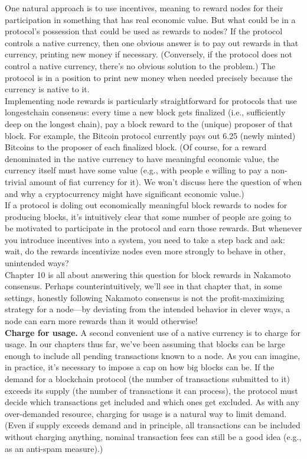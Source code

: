 One natural approach is to use incentives, meaning to reward nodes for their participation
in something that has real economic value. But what could be in a protocol’s possession
that could be used as rewards to nodes? If the protocol controls a native currency, then
one obvious answer is to pay out rewards in that currency, printing new money if necessary.
(Conversely, if the protocol does not control a native currency, there’s no obvious solution
to the problem.) The protocol is in a position to print new money when needed precisely
because the currency is native to it.\\

Implementing node rewards is particularly straightforward for protocols that use longestchain consensus: every time a new block gets finalized (i.e., sufficiently deep on the longest
chain), pay a block reward to the (unique) proposer of that block. For example, the Bitcoin
protocol currently pays out 6.25 (newly minted) Bitcoins to the proposer of each finalized block. (Of course, for a reward denominated in the native currency to have meaningful economic value, the
currency itself must have some value (e.g., with people e willing to pay a non-trivial amount of fiat currency
for it). We won’t discuss here the question of when and why a cryptocurrency might have significant economic
value.)\\

If a protocol is doling out economically meaningful block rewards to nodes for producing
blocks, it’s intuitively clear that some number of people are going to be motivated to participate in the protocol and earn those rewards. But whenever you introduce incentives into a
system, you need to take a step back and ask: wait, do the rewards incentivize nodes even
more strongly to behave in other, unintended ways?\\

Chapter 10 is all about answering this question for block rewards in Nakamoto consensus.
Perhaps counterintuitively, we’ll see in that chapter that, in some settings, honestly following
Nakamoto consensus is not the profit-maximizing strategy for a node—by deviating from the
intended behavior in clever ways, a node can earn more rewards than it would otherwise!\\

\noindent
\textbf{Charge for usage.} A second convenient use of a native currency is to charge for usage.
In our chapters thus far, we've been assuming that blocks can be large enough to include
all pending transactions known to a node. As you can imagine, in practice, it’s necessary
to impose a cap on how big blocks can be. If the demand for a blockchain protocol (the
number of transactions submitted to it) exceeds its supply (the number of transactions it
can process), the protocol must decide which transactions get included and which ones get
excluded. As with any over-demanded resource, charging for usage is a natural way to limit
demand. (Even if supply exceeds demand and in principle, all transactions can be included without charging
anything, nominal transaction fees can still be a good idea (e.g., as an anti-spam measure).)\\

